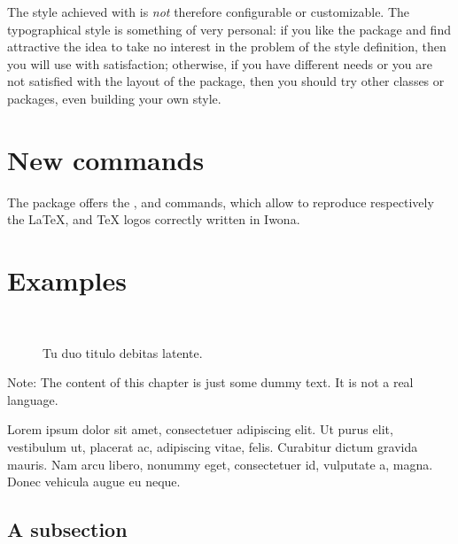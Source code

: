 The style achieved with \arsclassica{} is \emph{not} therefore configurable or customizable. The typographical style is something of very personal: if you like the package and find attractive the idea to take no interest in the problem of the style definition, then you will use \arsclassica{} with satisfaction; otherwise, if you have different needs or you are not satisfied with the layout of the package, then you should try other classes or packages, even building your own style.



\section{New commands}

The package offers the ,  and  commands, which allow to reproduce respectively the \LaTeX, \LaTeXe{} and \TeX{} logos correctly written in Iwona.






\section{Examples}

\begin{figure}
\centering
{} \quad
{} \\
 \quad
{}
\caption[Tu duo titulo debitas latente.]{Tu duo titulo debitas
latente.}\label{fig:example}
\end{figure}

Note: The content of this chapter is just some dummy text. It is not a real language.

Lorem ipsum dolor sit amet, consectetuer adipiscing elit. Ut purus elit, vestibulum ut, placerat ac, adipiscing vitae, felis. Curabitur dictum gravida mauris. Nam arcu libero, nonummy eget, consectetuer id, vulputate a, magna. Donec vehicula augue eu neque.

\subsection*{A subsection}
\lipsum[2]

